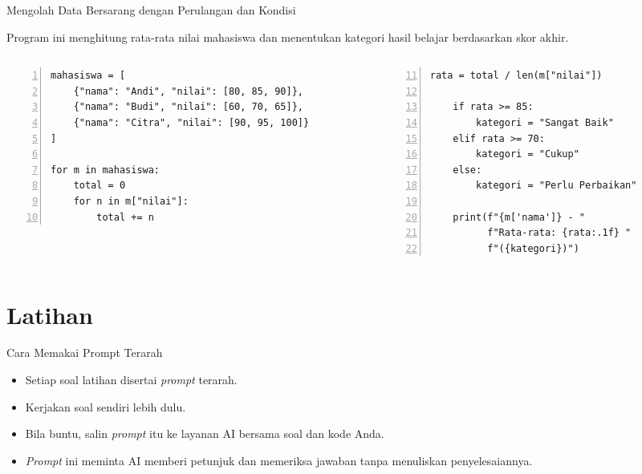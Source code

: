 \documentclass[aspectratio=169, table]{beamer}
\begin{document}
\begin{frame}[fragile]{Mengolah Data Bersarang dengan Perulangan dan Kondisi}
\vspace{20pt}

Program ini menghitung rata-rata nilai mahasiswa dan 
    menentukan kategori hasil belajar berdasarkan skor akhir.

\begin{columns}[T]
  \begin{column}{0.48\textwidth}
    \begin{lstlisting}[style=PythonStyle, numbers=left, firstnumber=1, basicstyle=\ttfamily\scriptsize]
mahasiswa = [
	{"nama": "Andi", "nilai": [80, 85, 90]},
	{"nama": "Budi", "nilai": [60, 70, 65]},
	{"nama": "Citra", "nilai": [90, 95, 100]}
]

for m in mahasiswa:
    total = 0
    for n in m["nilai"]:
        total += n
    \end{lstlisting}
  \end{column}

  \begin{column}{0.48\textwidth}
    \begin{lstlisting}[style=PythonStyle, numbers=left, firstnumber=11, basicstyle=\ttfamily\scriptsize]
    rata = total / len(m["nilai"])
    
    if rata >= 85:
        kategori = "Sangat Baik"
    elif rata >= 70:
        kategori = "Cukup"
    else:
        kategori = "Perlu Perbaikan"
    
    print(f"{m['nama']} - "
          f"Rata-rata: {rata:.1f} "
          f"({kategori})")
    \end{lstlisting}
  \end{column}
\end{columns}

\end{frame}

\section{Latihan}
\begin{frame}{Cara Memakai Prompt Terarah}
\begin{itemize}
\item Setiap soal latihan disertai \textit{prompt} terarah.
\item Kerjakan soal sendiri lebih dulu.
\item Bila buntu, salin \textit{prompt} itu ke layanan AI bersama soal dan kode Anda.
\item \textit{Prompt} ini meminta AI memberi petunjuk dan memeriksa jawaban tanpa menuliskan penyelesaiannya.
\end{itemize}
\end{frame}
\end{document}
